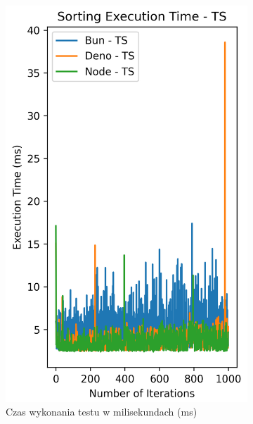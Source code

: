 \begin{figure}[H]
  \centering
  \begin{subfigure}[b]{0.42\textwidth}
    \centering
    \includegraphics[width=\textwidth]{Figures/sorting/sorting_quick_1000_10000_ts_time.png}
    \caption{Czas wykonania testu w milisekundach (ms)}
    \label{fig:quick_sorting_e4_ts_time}
  \end{subfigure}
  \begin{subfigure}[b]{0.42\textwidth}
    \centering

\end{subfigure}
\end{figure}
